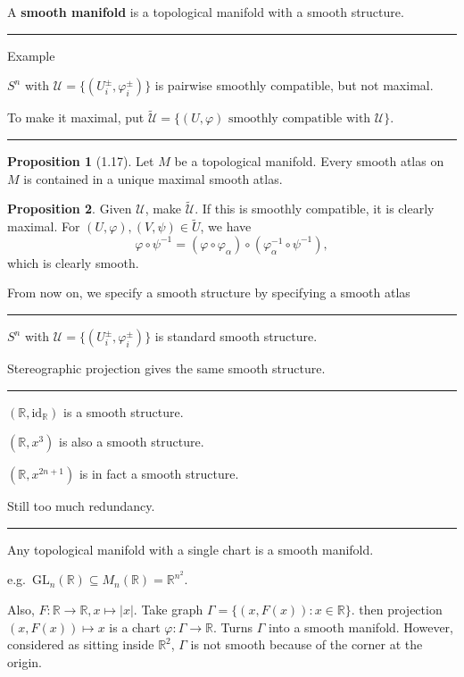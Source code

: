 \documentclass[12pt]{article}
\newcommand{\keyword}[1]{\textbf{#1}}
\newcommand{\sepline}{\rule{\textwidth}{0.4pt}}
\theoremstyle{definition}
\newtheorem{proposition}{Proposition}
\newcommand{\R}{\mathbb{R}}
\newcommand{\UU}{\mathcal{U}}
\renewcommand{\phi}{\varphi}
\newcommand{\<}{\left\langle}
\renewcommand{\>}{\right\rangle}
\newcommand{\seq}{\subseteq}
\newcommand{\GL}{\mathrm{GL}}
\newcommand{\id}{\mathrm{id}}
\renewcommand{\tilde}{\widetilde}
\begin{document}
A \keyword{smooth manifold} is a topological manifold with a smooth structure.

\sepline

Example

$S^n$ with $\UU = \{(U_i^\pm, \phi_i^\pm)\}$ is pairwise smoothly compatible, but not maximal.

To make it maximal, put $\tilde{\UU} = \{(U, \phi) \text{ smoothly compatible with } \UU\}$.

\sepline

\begin{proposition}[1.17]
    Let $M$ be a topological manifold.
    Every smooth atlas on $M$ is contained in a unique maximal smooth atlas.
\end{proposition}

\begin{proposition}
    Given $\UU$, make $\tilde{\UU}$.
    If this is smoothly compatible, it is clearly maximal.
    For $(U, \phi), (V, \psi) \in \tilde{U}$, we have
    \[
        \phi \circ \psi^{-1} = (\phi \circ \phi_\alpha) \circ (\phi_\alpha^{-1} \circ \psi^{-1}),
    \]
    which is clearly smooth.
\end{proposition}


From now on, we specify a smooth structure by specifying a smooth atlas 


\sepline

$S^n$ with $\UU = \{(U_i^\pm, \phi_i^\pm)\}$ is standard smooth structure.

Stereographic projection gives the same smooth structure.

\sepline

$(\R, \id_\R)$ is a smooth structure.

$(\R, x^3)$ is also a smooth structure.

$(\R, x^{2n+1})$ is in fact a smooth structure.

Still too much redundancy.

\sepline

Any topological manifold with a single chart is a smooth manifold.

e.g.\ $\GL_n(\R) \seq M_n(\R) = \R^{n^2}$.

Also, $F : \R \to \R, x \mapsto |x|$.
Take graph $\Gamma = \{(x, F(x)) : x \in \R\}$. then projection $(x, F(x)) \mapsto x$ is a chart $\phi : \Gamma \to \R$.
Turns $\Gamma$ into a smooth manifold.
However, considered as sitting inside $\R^2$, $\Gamma$ is not smooth because of the corner at the origin.
\end{document}
